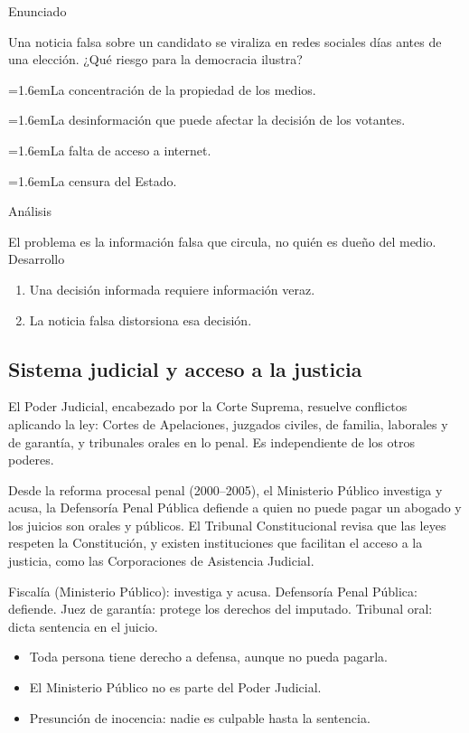 \documentclass[10pt,a4paper,twocolumn]{article}
\newcommand{\alternativa}[2]{\par\noindent\hangindent=1.6em\hangafter=1\makebox[1.6em][l]{\tecla{#1}}#2\par}
\newcommand{\clave}[1]{\par\smallskip{\sffamily\footnotesize\color{esmeralda} Clave \teclaok{#1}}\par}
\begin{document}
\begin{ejemplo}
{\sffamily\footnotesize\color{zinc500} Enunciado}\par
Una noticia falsa sobre un candidato se viraliza en redes sociales días antes de una elección. ¿Qué riesgo para la democracia ilustra?
\alternativa{A}{La concentración de la propiedad de los medios.}
\alternativa{B}{La desinformación que puede afectar la decisión de los votantes.}
\alternativa{C}{La falta de acceso a internet.}
\alternativa{D}{La censura del Estado.}
\clave{B}
{\sffamily\footnotesize\color{zinc500} Análisis}\par El problema es la información falsa que circula, no quién es dueño del medio.
{\sffamily\footnotesize\color{zinc500} Desarrollo}
\begin{enumerate}
  \item Una decisión informada requiere información veraz.
  \item La noticia falsa distorsiona esa decisión.
\end{enumerate}
\end{ejemplo}

\subsection{Sistema judicial y acceso a la justicia}

El Poder Judicial, encabezado por la Corte Suprema, resuelve conflictos aplicando la ley: Cortes de Apelaciones, juzgados civiles, de familia, laborales y de garantía, y tribunales orales en lo penal. Es independiente de los otros poderes.

Desde la reforma procesal penal (2000–2005), el Ministerio Público investiga y acusa, la Defensoría Penal Pública defiende a quien no puede pagar un abogado y los juicios son orales y públicos. El Tribunal Constitucional revisa que las leyes respeten la Constitución, y existen instituciones que facilitan el acceso a la justicia, como las Corporaciones de Asistencia Judicial.

\begin{definicion}
Fiscalía (Ministerio Público): investiga y acusa. Defensoría Penal Pública: defiende. Juez de garantía: protege los derechos del imputado. Tribunal oral: dicta sentencia en el juicio.
\end{definicion}

\begin{ideasclave}
\begin{itemize}
  \item Toda persona tiene derecho a defensa, aunque no pueda pagarla.
  \item El Ministerio Público no es parte del Poder Judicial.
  \item Presunción de inocencia: nadie es culpable hasta la sentencia.
\end{itemize}
\end{ideasclave}
\end{document}
